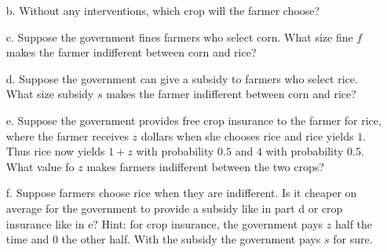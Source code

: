 \documentclass{article}
\begin{document}
\begin{enumerate}
\begin{enumerate}
        \item[b.] Without any interventions, which crop will the farmer choose?
        
        \vspace{2cm}
        
        
        \item[c.] Suppose the government fines farmers who select corn. What size fine $f$ makes the farmer indifferent between corn and rice?
        
        \vspace{4cm}
        
        
        \item[d.] Suppose the government can give a subsidy to farmers who select rice. What size subsidy $s$ makes the farmer indifferent between corn and rice?
        
        \vspace{4cm}
        
        
        \item[e.] Suppose the government provides free crop insurance to the farmer for rice, where the farmer receives $z$ dollars when she chooses rice and rice yields $1$. Thus rice now yields $1+z$ with probability $0.5$ and $4$ with probability $0.5$. What value fo $z$ makes farmers indifferent between the two crops?
        
        \vspace{4cm}
        
        \item[f.] Suppose farmers choose rice when they are indifferent. Is it cheaper on average for the government to provide a subsidy like in part d or crop insurance like in e? Hint: for crop insurance, the government pays $z$ half the time and 0 the other half. With the subsidy the government pays $s$ for sure.
        
        \vspace{4cm}
        
    \end{enumerate}
\end{enumerate}
\end{document}
